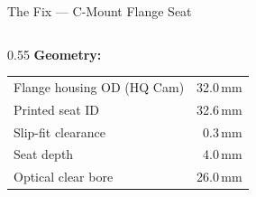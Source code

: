 \documentclass[aspectratio=169,11pt]{beamer}
\begin{document}
\begin{frame}{The Fix --- C-Mount Flange Seat}
\begin{columns}[T]
\begin{column}{0.55\textwidth}
      \vspace{0.3em}
      \textbf{Geometry:}
      \footnotesize
      \begin{tabular}{@{}lr@{}}
        \toprule
        Flange housing OD (HQ Cam) & 32.0\,mm \\
        Printed seat ID & 32.6\,mm \\
        Slip-fit clearance & 0.3\,mm \\
        Seat depth & 4.0\,mm \\
        Optical clear bore & 26.0\,mm \\
        \bottomrule
      \end{tabular}
    \end{column}
  \end{columns}

\end{frame}
\end{document}
